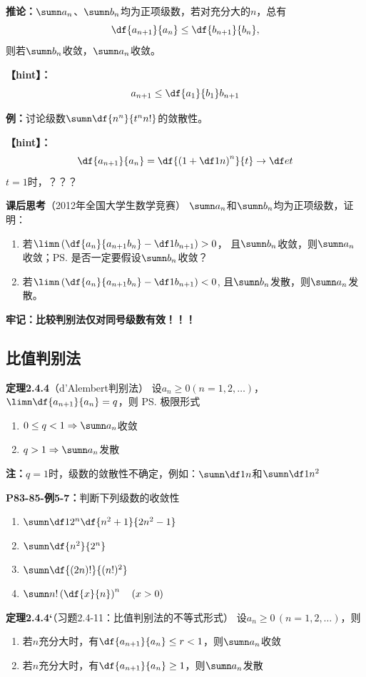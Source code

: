 {\bf 推论：}$\sumn a_n$、$\sumn b_n$均为正项级数，若对充分大的$n$，总有
$$\df{a_{n+1}}{a_n}\leq\df{b_{n+1}}{b_n},$$
则若$\sumn b_n$收敛，$\sumn a_n$收敛。

{\bf 【hint】：}
$$a_{n+1}\leq\df{a_1}{b_1}b_{n+1}$$

{\bf 例：}讨论级数$\sumn\df{n^n}{t^nn!}$的敛散性。

{\bf 【hint】：}
$$\df{a_{n+1}}{a_n}=\df{\left(1+\df1n\right)^n}{t}\to\df et$$
$t=1$时，？？？

{\bf 课后思考}（2012年全国大学生数学竞赛）
$\sumn a_n$和$\sumn b_n$均为正项级数，证明：
\begin{enumerate}
  \setlength{\itemindent}{1cm}
  \item 若$\limn\left(\df{a_n}{a_{n+1}b_n}-\df 1{b_{n+1}}\right)>0$，
  且$\sumn b_n$收敛，则$\sumn a_n$收敛；\ps{是否一定要假设$\sumn b_n$收敛？}
  \item 若$\limn\left(\df{a_n}{a_{n+1}b_n}-\df 1{b_{n+1}}\right)<0$,
  且$\sumn b_n$发散，则$\sumn a_n$发散。
\end{enumerate}

{\bf 牢记：比较判别法仅对同号级数有效！！！}

\subsection{比值判别法}

{\bf 定理2.4.4}（d'Alembert判别法）
设$a_n\geq 0(n=1,2,\ldots)$，$\limn\df{a_{n+1}}{a_n}=q$，则
\ps{极限形式} 
\begin{enumerate}
  \setlength{\itemindent}{1cm}
  \item $0\leq q<1\Rightarrow\sumn a_n$收敛 
  \item $q>1\Rightarrow\sumn a_n$发散
\end{enumerate}

{\bf 注：}$q=1$时，级数的敛散性不确定，例如：$\sumn\df 1n$和$\sumn\df 1{n^2}$

{\bf P83-85-例5-7：}判断下列级数的收敛性
\begin{enumerate} [(1)]
  \setlength{\itemindent}{1cm}
  \item $\sumn\df 1{2^n}\df{n^2+1}{2n^2-1}$ 
  \item $\sumn\df{n^2}{2^n}$ 
  \item $\sumn\df{(2n)!}{(n!)^2}$
  \item $\sumn n!\left(\df{x}{n}\right)^n\quad (x>0)$
\end{enumerate}

{\bf 定理2.4.4‘}（习题2.4-11：比值判别法的不等式形式）
设$a_n\geq 0\,(n=1,2,\ldots)$，则 
\begin{enumerate}
  \setlength{\itemindent}{1cm}
  \item 若$n$充分大时，有$\df{a_{n+1}}{a_n}\leq r<1$，则$\sumn a_n$收敛 
  \item 若$n$充分大时，有$\df{a_{n+1}}{a_n}\geq 1$，则$\sumn a_n$发散 
\end{enumerate}

